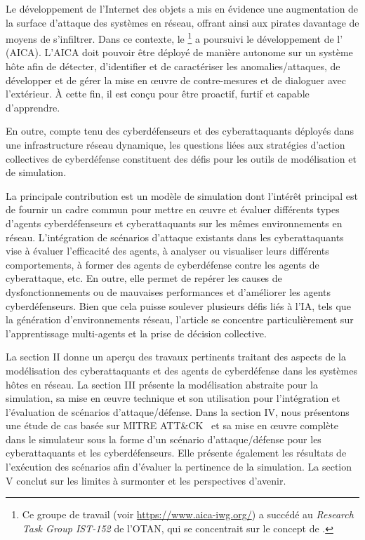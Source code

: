 \noindent
Le développement de l'Internet des objets a mis en évidence une augmentation de la surface d'attaque des systèmes en réseau, offrant ainsi aux pirates davantage de moyens de s'infiltrer.
Dans ce contexte, le \footnote{Ce groupe de travail (voir \url{https://www.aica-iwg.org/}) a succédé au \textit{Research Task Group IST-152} de l'OTAN, qui se concentrait sur le concept de .} a poursuivi le développement de l' (AICA).
L'AICA doit pouvoir être déployé de manière autonome sur un système hôte afin de détecter, d'identifier et de caractériser les anomalies/attaques, de développer et de gérer la mise en œuvre de contre-mesures et de dialoguer avec l'extérieur. À cette fin, il est conçu pour être proactif, furtif et capable d'apprendre.

En outre, compte tenu des cyberdéfenseurs et des cyberattaquants déployés dans une infrastructure réseau dynamique, les questions liées aux stratégies d'action collectives de cyberdéfense constituent des défis pour les outils de modélisation et de simulation.

\noindent
La principale contribution est un modèle de simulation dont l'intérêt principal est de fournir un cadre commun pour mettre en œuvre et évaluer différents types d'agents cyberdéfenseurs et cyberattaquants sur les mêmes environnements en réseau. L'intégration de scénarios d'attaque existants dans les cyberattaquants vise à évaluer l'efficacité des agents, à analyser ou visualiser leurs différents comportements, à former des agents de cyberdéfense contre les agents de cyberattaque, etc. En outre, elle permet de repérer les causes de dysfonctionnements ou de mauvaises performances et d'améliorer les agents cyberdéfenseurs. Bien que cela puisse soulever plusieurs défis liés à l'IA, tels que la génération d'environnements réseau, l'article se concentre particulièrement sur l'apprentissage multi-agents et la prise de décision collective.

La section II donne un aperçu des travaux pertinents traitant des aspects de la modélisation des cyberattaquants et des agents de cyberdéfense dans les systèmes hôtes en réseau. La section III présente la modélisation abstraite pour la simulation, sa mise en œuvre technique et son utilisation pour l'intégration et l'évaluation de scénarios d'attaque/défense. Dans la section IV, nous présentons une étude de cas basée sur MITRE ATT\&CK~\cite{MITREATTACKWebiste} et sa mise en œuvre complète dans le simulateur sous la forme d'un scénario d'attaque/défense pour les cyberattaquants et les cyberdéfenseurs. Elle présente également les résultats de l'exécution des scénarios afin d'évaluer la pertinence de la simulation. La section V conclut sur les limites à surmonter et les perspectives d'avenir.

